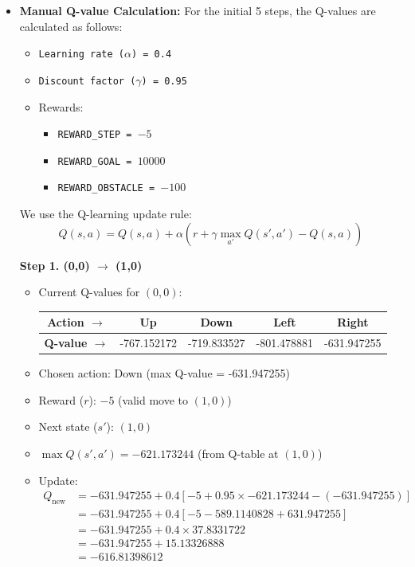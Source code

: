 \documentclass{article}
\begin{document}
\begin{itemize}
\vspace{5pt}

\item \textbf{Manual Q-value Calculation:} For the initial 5 steps, the Q-values are calculated as follows:

\begin{itemize}
    \item \texttt{Learning rate (\(\alpha\)) = 0.4}
    \item \texttt{Discount factor (\(\gamma\)) = 0.95}
    \item Rewards: 
    \begin{itemize}
        \item \texttt{REWARD\_STEP = \(-5\)}
        \item \texttt{REWARD\_GOAL = \(10000\)}
        \item \texttt{REWARD\_OBSTACLE = \(-100\)}
    \end{itemize}
\end{itemize}

We use the Q-learning update rule:
\begin{equation}
    Q(s,a) = Q(s,a) + \alpha \left( r + \gamma \max_{a'} Q(s', a') - Q(s,a) \right)
\end{equation}

\noindent\textbf{Step 1. (0,0) \(\rightarrow\) (1,0)}
\begin{itemize}
    \item Current Q-values for \((0,0)\):
    \begin{tabular}{|c|c|c|c|c|}
        \textbf{Action $\rightarrow$ } & Up & Down & Left & Right \\
        \hline
        \textbf{Q-value $\rightarrow$ } & -767.152172 & -719.833527 & -801.478881 & -631.947255 \\
    \end{tabular}
    \vspace{10pt}
    \item Chosen action: Down (max Q-value = -631.947255)
    \item Reward (\(r\)): \(-5\) (valid move to \((1,0)\))
    \item Next state (\(s'\)): \((1,0)\)
    \item \(\max Q(s', a') = -621.173244\) (from Q-table at \((1,0)\))
    \item Update:
    \begin{align*}
        Q_{\text{new}} &= -631.947255 + 0.4 \left[ -5 + 0.95 \times -621.173244 - (-631.947255) \right] \\
        &= -631.947255 + 0.4 \left[ -5 - 589.1140828 + 631.947255 \right] \\
        &= -631.947255 + 0.4 \times 37.8331722 \\
        &= -631.947255 + 15.13326888 \\
        &= -616.81398612
    \end{align*}
\end{itemize}


\end{itemize}
\end{document}
